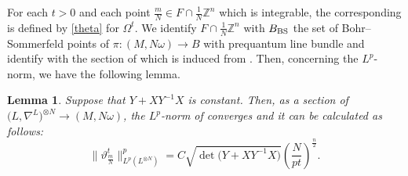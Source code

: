 \documentclass[pdftex]{sigma}
\numberwithin{equation}{section}
\newtheorem{Lemma}[Theorem]{Lemma}
\newcommand{\Z}{\mathbb{Z}}
\begin{document}
For each $t>0$ and each point $\frac{m}{N}\in F\cap \frac{1}{N}\Z^n$ which is integrable, the corresponding  is defined by \eqref{theta} for $\Omega^t$. We identify $F\cap \frac{1}{N}\Z^n$ with $B_{\rm BS}$ the set of Bohr--Sommerfeld points of $\pi \colon (M,N\omega)\to B$ with prequantum line bundle  and identify  with the section of  which is induced from . Then, concerning the $L^p$-norm, we have the following lemma.
\begin{Lemma}\label{norm of theta}
Suppose that $Y+XY^{-1}X$ is constant. Then, as a section of $\bigl(L,\nabla^L\bigr)^{\otimes N}\to (M,N\omega)$, the $L^p$-norm of  converges and it can be calculated as follows:
\begin{equation*}
\big\|\vartheta^t_{\frac{m}{N}}\big\|_{L^p(L^{\otimes N})}^p=C\sqrt{\det \bigl(Y+XY^{-1}X\bigr)}\left(\frac{N}{pt}\right)^\frac{n}{2}.
\end{equation*}
\end{Lemma}
\end{document}
